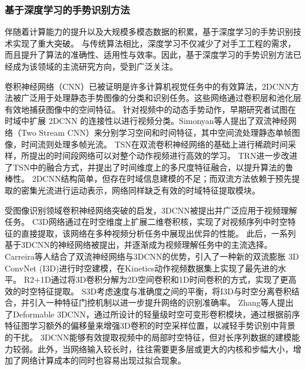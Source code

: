 \subsubsection{基于深度学习的手势识别方法} %
伴随着计算能力的提升以及大规模多模态数据的积累，基于深度学习的手势识别技术实现了重大突破。
与传统算法相比，深度学习不仅减少了对手工工程的需求，而且提升了算法的准确性、适用性与效率。因此，基于深度学习的手势识别方法已经成为该领域的主流研究方向，受到广泛关注。

卷积神经网络（CNN）已被证明是许多计算机视觉任务中的有效算法，2DCNN方法被广泛用于处理静态手势图像的分类和识别任务。这些网络通过卷积层和池化层有效地捕获图像中的空间特征。
针对视频中的动态手势动作，早期研究者试图在时域中扩展 2DCNN 的连接性以进行视频分类\cite{karpathy2014large}。Simonyan等人\cite{simonyan2014twostream}提出了双流神经网络（Two Stream CNN）来分别学习空间和时间特征，其中空间流处理静态单帧图像，时间流则处理多帧光流。
TSN\cite{wang2016tsn}在双流卷积神经网络的基础上进行稀疏时间采样，所提出的时间段网络可以对整个动作视频进行高效的学习。
TRN\cite{zhou2018trn}进一步改进了TSN中的融合方式，并提出了时间维度上的多尺度特征融合，以提升算法的鲁棒性。
2DCNN结构简单，但存在时域信息建模的不足；而双流方法依赖于预先提取的密集光流进行运动表示，网络同样缺乏有效的时域特征提取模块。

受图像识别领域卷积神经网络突破的启发，3DCNN被提出并广泛应用于视频理解任务。
C3D网络\cite{tran2015c3d}通过在时空维度上扩展二维卷积核，实现了对视频序列中时空特征的直接提取，该网络在多种视频分析任务中展现出优异的性能。
此后，一系列基于3DCNN的神经网络被提出，并逐渐成为视频理解任务中的主流选择。
Carreira等人\cite{carreira2017i3d}结合了双流神经网络与3DCNN的优势，引入了一种新的双流膨胀 3D ConvNet (I3D)进行时空建模，在Kinetics动作视频数据集上实现了最先进的水平。
R2+1D\cite{tran2018r2+1d}通过将3D卷积分解为2D空间卷积和1D时间卷积的方式，实现了更高效的时空特征提取。
S3D\cite{xie2018s3d}考虑速度与准确度之间的平衡，将I3D与时空分离卷积结合，并引入一种特征门控机制以进一步提升网络的识别准确率。
Zhang等人提出了Deformable 3DCNN\cite{zhang2020deformable3d}，通过所设计的轻量级时空可变形卷积模块，通过根据前序特征图学习额外的偏移量来增强3D卷积的时空采样位置，以减轻手势识别中背景的干扰。
3DCNN能够有效提取视频中的局部时空特征，但对长序列数据的建模能力较弱。此外，当网络输入较长时，往往需要更多层或更大的内核和步幅大小，增加了网络计算成本的同时也容易出现过拟合现象。


